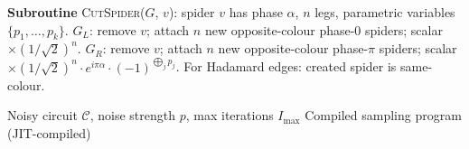 \documentclass[a4paper,onecolumn,11pt,accepted=2026-06-10]{quantumarticle}
\begin{document}
\begin{algorithm}[H]
\begin{algorithmic}[1]
\Statex
\Statex \hrulefill
\Statex \textbf{Subroutine} \textsc{CutSpider}($G$, $v$):
    spider $v$ has phase $\alpha$, $n$ legs, parametric variables $\{p_1,\ldots,p_k\}$.
\Statex \quad $G_L$: remove $v$; attach $n$ new opposite-colour phase-$0$ spiders;
    scalar $\times (1/\sqrt{2})^n$.
\Statex \quad $G_R$: remove $v$; attach $n$ new opposite-colour phase-$\pi$ spiders;
    scalar $\times (1/\sqrt{2})^n \cdot e^{i\pi\alpha} \cdot (-1)^{\bigoplus_j p_j}$.
\Statex \quad For Hadamard edges: created spider is same-colour.
\end{algorithmic}
\end{algorithm}

\clearpage

\begin{algorithm}[H]
\small
\caption{Compile circuit and precompute split f/m row sums.}
\label{algo:compile}
\begin{algorithmic}[1]
\Input Noisy circuit $\mathcal{C}$, noise strength $p$, max iterations $I_{\max}$
\Output Compiled sampling program (JIT-compiled)


\end{algorithmic}
\end{algorithm}
\end{document}
